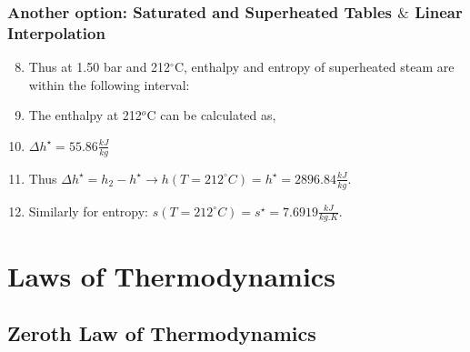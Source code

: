 \documentclass[10pt,compress]{beamer}
\begin{document}
\begin{frame}
  \frametitle{Another option: Saturated and Superheated Tables $\&$ Linear Interpolation}
\noindent
\begin{enumerate}\setcounter{enumi}{7}\scriptsize
\item <1-> Thus at 1.50 bar and 212$^{\circ}$C, enthalpy and entropy of superheated steam are within the following interval:
\item<2-> The enthalpy at 212$^{o}$C can be calculated as,
\item <4-> $\Delta h^{\star}=55.86\frac{kJ}{kg}$ 
\item <4-> Thus $\Delta h^{\star}= h_{2}-h^{\star} \longrightarrow h\left(T=212^{\circ}C\right)=h^{\star}=2896.84\frac{kJ}{kg}$.
\item<5-> Similarly for entropy: $s\left(T=212^{\circ}C\right)=s^{\star}=7.6919\frac{kJ}{kg.K}$.
\end{enumerate}

\end{frame}



\section{Laws of Thermodynamics}


\subsection{Zeroth Law of Thermodynamics}
\end{document}
